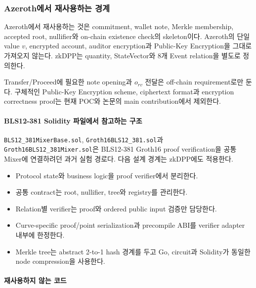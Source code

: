\documentclass[11pt]{extarticle}
\begin{document}
\subsubsection{Azeroth에서 재사용하는 경계}

Azeroth에서 재사용하는 것은 commitment, wallet note, Merkle membership, accepted root,
nullifier와 on-chain existence check의 skeleton이다. Azeroth의 단일 value $v$, encrypted
account, auditor encryption과 Public-Key Encryption을 그대로 가져오지 않는다. zkDPP는
quantity, StateVector와 8개 Event relation을 별도로 정의한다.

Transfer/Proceed에 필요한 note opening과 $o_{rv}$ 전달은 off-chain requirement로만
둔다. 구체적인 Public-Key Encryption scheme, ciphertext format과 encryption correctness
proof는 현재 POC와 논문의 main contribution에서 제외한다.

\paragraph{BLS12-381 Solidity 파일에서 참고하는 구조}

\texttt{BLS12\_381MixerBase.sol}, \texttt{Groth16BLS12\_381.sol}과
\texttt{Groth16BLS12\_381Mixer.sol}은 BLS12-381 Groth16 proof verification을
공통 Mixer에 연결하려던 과거 실험 경로다. 다음 설계 경계는 zkDPP에도 적용한다.

\begin{itemize}
  \item Protocol state와 business logic을 proof verifier에서 분리한다.
  \item 공통 contract는 root, nullifier, tree와 registry를 관리한다.
  \item Relation별 verifier는 proof와 ordered public input 검증만 담당한다.
  \item Curve-specific proof/point serialization과 precompile ABI를 verifier
        adapter 내부에 한정한다.
  \item Merkle tree는 abstract 2-to-1 hash 경계를 두고 Go, circuit과 Solidity가
        동일한 node compression을 사용한다.
\end{itemize}

\paragraph{재사용하지 않는 코드}
\end{document}
